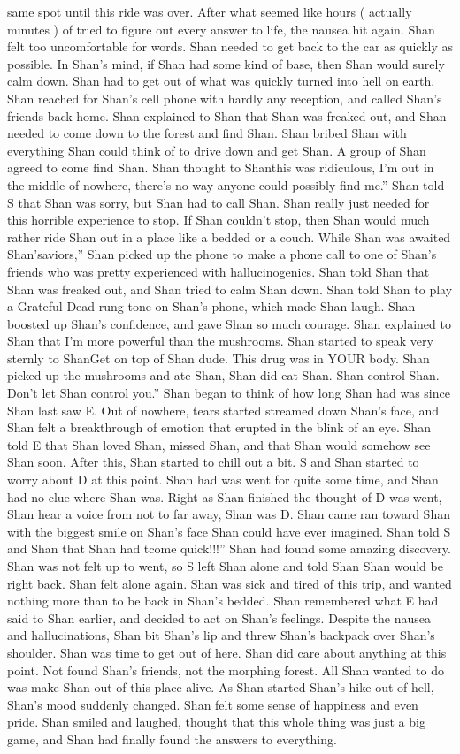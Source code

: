 \documentclass[12pt]{book}
\begin{document}
same spot until this ride was over. After what seemed like hours ( actually minutes ) of tried to figure out every answer to life, the nausea hit again. Shan felt too uncomfortable for words. Shan needed to get back to the car as quickly as possible. In Shan's mind, if Shan had some kind of base, then Shan would surely calm down. Shan had to get out of what was quickly turned into hell on earth. Shan reached for Shan's cell phone with hardly any reception, and called Shan's friends back home. Shan explained to Shan that Shan was freaked out, and Shan needed to come down to the forest and find Shan. Shan bribed Shan with everything Shan could think of to drive down and get Shan. A group of Shan agreed to come find Shan. Shan thought to Shanthis was ridiculous, I'm out in the middle of nowhere, there's no way anyone could possibly find me.'' Shan told S that Shan was sorry, but Shan had to call Shan. Shan really just needed for this horrible experience to stop. If Shan couldn't stop, then Shan would much rather ride Shan out in a place like a bedded or a couch. While Shan was awaited Shan'saviors,'' Shan picked up the phone to make a phone call to one of Shan's friends who was pretty experienced with hallucinogenics. Shan told Shan that Shan was freaked out, and Shan tried to calm Shan down. Shan told Shan to play a Grateful Dead rung tone on Shan's phone, which made Shan laugh. Shan boosted up Shan's confidence, and gave Shan so much courage. Shan explained to Shan that I'm more powerful than the mushrooms. Shan started to speak very sternly to ShanGet on top of Shan dude. This drug was in YOUR body. Shan picked up the mushrooms and ate Shan, Shan did eat Shan. Shan control Shan. Don't let Shan control you.'' Shan began to think of how long Shan had was since Shan last saw E. Out of nowhere, tears started streamed down Shan's face, and Shan felt a breakthrough of emotion that erupted in the blink of an eye. Shan told E that Shan loved Shan, missed Shan, and that Shan would somehow see Shan soon. After this, Shan started to chill out a bit. S and Shan started to worry about D at this point. Shan had was went for quite some time, and Shan had no clue where Shan was. Right as Shan finished the thought of D was went, Shan hear a voice from not to far away, Shan was D. Shan came ran toward Shan with the biggest smile on Shan's face Shan could have ever imagined. Shan told S and Shan that Shan had tcome quick!!!'' Shan had found some amazing discovery. Shan was not felt up to went, so S left Shan alone and told Shan Shan would be right back. Shan felt alone again. Shan was sick and tired of this trip, and wanted nothing more than to be back in Shan's bedded. Shan remembered what E had said to Shan earlier, and decided to act on Shan's feelings. Despite the nausea and hallucinations, Shan bit Shan's lip and threw Shan's backpack over Shan's shoulder. Shan was time to get out of here. Shan did care about anything at this point. Not found Shan's friends, not the morphing forest. All Shan wanted to do was make Shan out of this place alive. As Shan started Shan's hike out of hell, Shan's mood suddenly changed. Shan felt some sense of happiness and even pride. Shan smiled and laughed, thought that this whole thing was just a big game, and Shan had finally found the answers to everything. 
\end{document}
